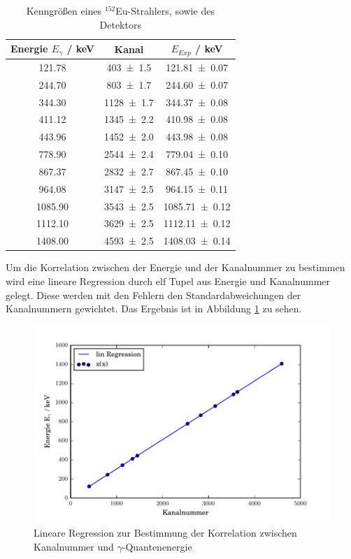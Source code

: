 \begin{table}[H]
  \centering
  \caption{Kenngrößen eines $^{152}$Eu-Strahlers, sowie des Detektors}
  \begin{tabular}{c | c c }
    \toprule
    Energie $E_{\gamma}$ / keV \cite{V18}& Kanal & $E_{Exp}$ / keV \\
    \hline
    121.78  & \num{403 +- 1,5}	& \num{121,81 +- 0,07}	\\
    244.70  & \num{803 +- 1,7}  & \num{244,60 +- 0,07}	\\
    344.30  & \num{1128+- 1,7}	& \num{344,37 +- 0,08}	\\
    411.12  & \num{1345+- 2,2}	& \num{410,98 +- 0,08}	\\
    443.96  & \num{1452+- 2,0}	& \num{443,98 +- 0,08}	\\
    778.90  & \num{2544+- 2,4}	& \num{779,04 +- 0,10}	\\
    867.37  & \num{2832+- 2,7}	& \num{867,45 +- 0,10}	\\
    964.08  & \num{3147+- 2,5}	& \num{964,15 +- 0,11}	\\
    1085.90 & \num{3543+- 2,5}	& \num{1085,71 +- 0,12}	\\
    1112.10 & \num{3629+- 2,5}	& \num{1112,11 +- 0,12}	\\
    1408.00 & \num{4593+- 2,5}	& \num{1408,03 +- 0,14}	\\
    \bottomrule
  \end{tabular}
  \label{tab:CsSpekt}
\end{table}

Um die Korrelation zwischen der Energie und der Kanalnummer zu bestimmen wird eine lineare Regression durch elf Tupel aus Energie und Kanalnummer gelegt. Diese werden mit den Fehlern den Standardabweichungen der Kanalnummern gewichtet. Das Ergebnis ist in Abbildung \ref{fig:RegEu} zu sehen.

\begin{figure}[H]
  \centering
  \includegraphics[width=\textwidth]{./build/CsReg.pdf}
  \caption{Lineare Regression zur Bestimmung der Korrelation zwischen Kanalnummer und $\gamma$-Quantenenergie}
  \label{fig:RegEu}
\end{figure}

